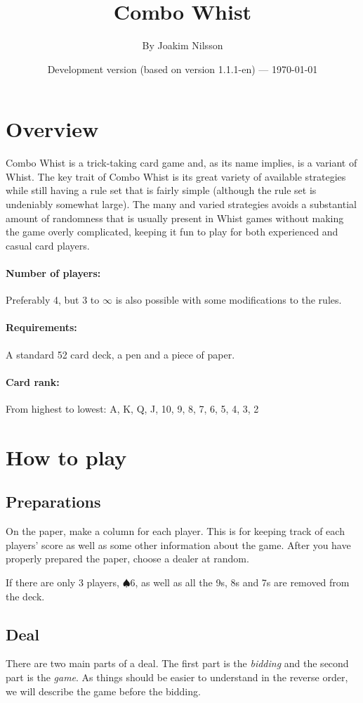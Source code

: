\documentclass[a4paper]{article}
\title{Combo Whist}
\author{By Joakim Nilsson}
\date{Development version (based on version 1.1.1-en) --- \today}
\begin{document}
	\introPages

	\section{Overview}
		Combo Whist is a trick-taking card game and, as its name implies, is a variant of Whist. The key trait of Combo Whist is its great variety of available strategies while still having a rule set that is fairly simple (although the rule set is undeniably somewhat large). The many and varied strategies avoids a substantial amount of randomness that is usually present in Whist games without making the game overly complicated, keeping it fun to play for both experienced and casual card players.

		\paragraph{Number of players:}
			Preferably 4, but 3 to $\infty$ is also possible with some modifications to the rules.

		\paragraph{Requirements:}
			A standard 52 card deck, a pen and a piece of paper.

		\paragraph{Card rank:}
			From highest to lowest: A, K, Q, J, 10, 9, 8, 7, 6, 5, 4, 3, 2

	\section{How to play}
		\subsection{Preparations}
			On the paper, make a column for each player. This is for keeping track of each players' score as well as some other information about the game. After you have properly prepared the paper, choose a dealer at random.

			If there are only 3 players, $\spadesuit 6$, as well as all the 9s, 8s and 7s are removed from the deck.

		\subsection{Deal}
			There are two main parts of a deal. The first part is the \emph{bidding} and the second part is the \emph{game}. As things should be easier to understand in the reverse order, we will describe the game before the bidding.
\end{document}
